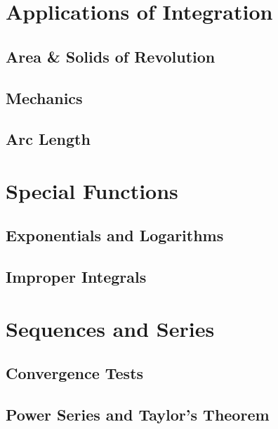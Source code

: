 \section{Applications of Integration}


\subsection{Area \& Solids of Revolution}

\subsection{Mechanics}

\subsection{Arc Length}



\section{Special Functions}

\subsection{Exponentials and Logarithms}

\subsection{Improper Integrals}



\section{Sequences and Series}

\subsection{Convergence Tests}

\subsection{Power Series and Taylor's Theorem}

